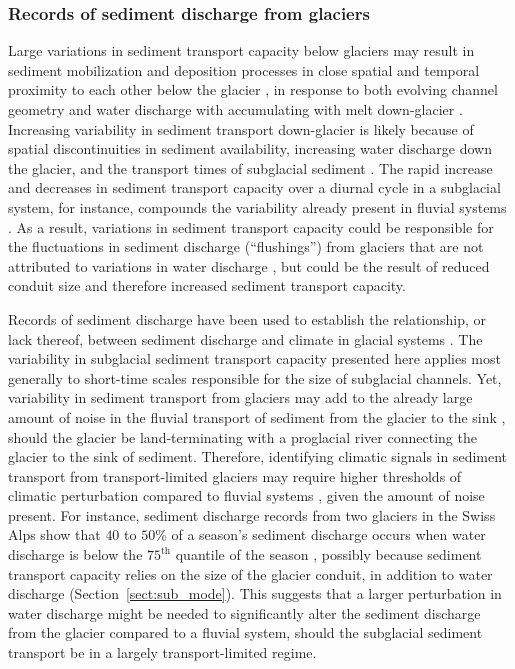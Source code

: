 \documentclass[11pt]{article}
\begin{document}
\begin{spacing}{1}
  
  \subsubsection{Records of sediment discharge  from glaciers}

  Large variations in sediment transport capacity below glaciers may result in sediment mobilization and deposition processes in close spatial and temporal proximity to each other below the glacier \citep{gimbert2016,perolo2018}, in response to both evolving channel geometry and water discharge with accumulating with melt down-glacier \citep{beaud2018,delaney2019}.
  Increasing variability in sediment transport down-glacier is likely because of spatial discontinuities in sediment availability, increasing water discharge down the glacier, and the transport times of subglacial sediment \citep{williams1989,delaney2019}.
  The rapid increase and decreases in sediment transport capacity over a diurnal cycle in a subglacial system, for instance, compounds the variability already present in fluvial systems \citep{williams1989,jerolmack2010}.
  As a result, variations in sediment transport capacity could be responsible for the fluctuations in sediment discharge (``flushings'') from glaciers that are not attributed to variations in water discharge \citep[e.g.][]{richards2003,swift2021}, but could be the result of reduced conduit size and therefore increased sediment transport capacity.
  
   Records of sediment discharge have been used to establish the relationship, or lack thereof, between sediment discharge and climate in glacial systems \citep[e.g.][]{koppes2009a,willenbring2016,mariotti2021}.
  The variability in subglacial sediment transport capacity presented here applies most generally to short-time scales responsible for the size of subglacial channels.
  Yet, variability in sediment transport from glaciers may add to the already large amount of noise in the fluvial transport of sediment from the glacier to the sink  \citep{castletort2003,jerolmack2010,romans2016}, should the glacier be land-terminating with a proglacial river connecting the glacier to the sink of sediment.
   Therefore, identifying climatic signals in sediment transport from transport-limited glaciers may require higher thresholds of climatic perturbation compared to fluvial systems \citep{tofelde2021}, given the amount of noise present.
  For instance, sediment discharge records from two glaciers in the Swiss Alps show that $40$ to $50$\% of a season's sediment discharge occurs when water discharge is below the $75^{\mathrm{th}}$ quantile of the season \citep{delaney2018}, possibly because sediment transport capacity relies on the size of the glacier conduit, in addition to water discharge (Section~\ref{sect:sub_mode}).
  This suggests that a larger perturbation in water discharge might be needed to significantly alter the sediment discharge from the glacier compared to a fluvial system, should the subglacial sediment transport be in a largely transport-limited regime.
 

\end{spacing}
\end{document}
